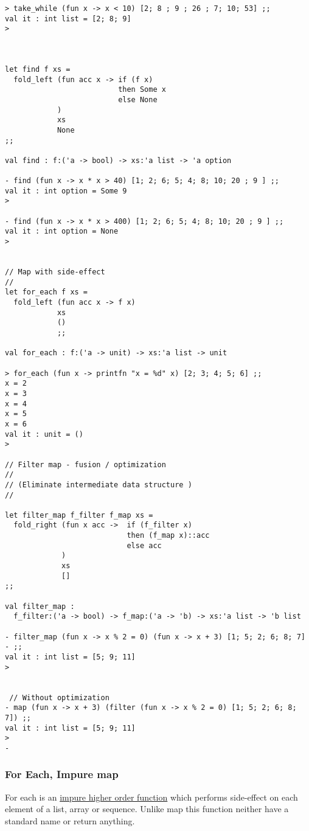 \documentclass[11pt]{article}
\begin{document}
\begin{enumerate}
\begin{verbatim}
> take_while (fun x -> x < 10) [2; 8 ; 9 ; 26 ; 7; 10; 53] ;;
val it : int list = [2; 8; 9]
> 



let find f xs =
  fold_left (fun acc x -> if (f x)
                          then Some x
                          else None 
            )
            xs
            None
;;
  
val find : f:('a -> bool) -> xs:'a list -> 'a option

- find (fun x -> x * x > 40) [1; 2; 6; 5; 4; 8; 10; 20 ; 9 ] ;;
val it : int option = Some 9
> 

- find (fun x -> x * x > 400) [1; 2; 6; 5; 4; 8; 10; 20 ; 9 ] ;;
val it : int option = None
> 


// Map with side-effect 
//
let for_each f xs =
  fold_left (fun acc x -> f x)
            xs
            ()
            ;;

val for_each : f:('a -> unit) -> xs:'a list -> unit

> for_each (fun x -> printfn "x = %d" x) [2; 3; 4; 5; 6] ;;
x = 2
x = 3
x = 4
x = 5
x = 6
val it : unit = ()
> 

// Filter map - fusion / optimization  
//
// (Eliminate intermediate data structure )
//

let filter_map f_filter f_map xs = 
  fold_right (fun x acc ->  if (f_filter x)
                            then (f_map x)::acc
                            else acc
             )
             xs
             []
;;
             
val filter_map :
  f_filter:('a -> bool) -> f_map:('a -> 'b) -> xs:'a list -> 'b list

- filter_map (fun x -> x % 2 = 0) (fun x -> x + 3) [1; 5; 2; 6; 8; 7]
- ;;             
val it : int list = [5; 9; 11]
> 


 // Without optimization
- map (fun x -> x + 3) (filter (fun x -> x % 2 = 0) [1; 5; 2; 6; 8; 7]) ;;
val it : int list = [5; 9; 11]
> 
-
\end{verbatim}
\end{enumerate}

\subsubsection{For Each, Impure map}
\label{sec-1-9-5}

For each is an \uline{impure higher order function} which performs
side-effect on each element of a list, array or sequence. Unlike map
this function neither have a standard name or return anything.
\end{document}
